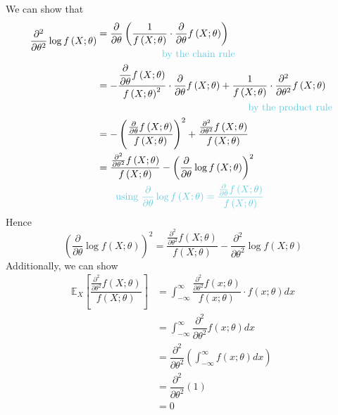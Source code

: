 \documentclass[11pt]{report} %
\begin{document}
We can show that
\begin{align}
\dfrac{\partial^{2}}{\partial \theta^{2}}\log f\left(X;\theta\right) & \begin{multlined}=\dfrac{\partial}{\partial \theta}\left(\dfrac{1}{f\left(X;\theta\right)}\cdot\dfrac{\partial}{\partial \theta}f\left(X;\theta\right)\right) \\
\text{\blue by the chain rule \black} \end{multlined} \\
& \begin{multlined}= -\dfrac{\dfrac{\partial}{\partial \theta}f\left(X;\theta\right)}{f\left(X;\theta\right)^{2}}\cdot\dfrac{\partial}{\partial \theta}f\left(X;\theta\right) + \dfrac{1}{f\left(X;\theta\right)}\cdot \dfrac{\partial^{2}}{\partial \theta^{2}}f\left(X;\theta\right) \\
\text{\blue by the product rule \black} \end{multlined} \\
&= -\left(\dfrac{\frac{\partial}{\partial \theta}f\left(X;\theta\right)}{f\left(X;\theta\right)}\right)^{2} + \dfrac{\frac{\partial^{2}}{\partial \theta^{2}}f\left(X;\theta\right)}{f\left(X;\theta\right)} \\
& \begin{multlined}= \dfrac{\frac{\partial^{2}}{\partial \theta^{2}}f\left(X;\theta\right)}{f\left(X;\theta\right)} - \left(\dfrac{\partial}{\partial \theta}\log f\left(X;\theta\right)\right)^{2} \\
\text{\blue using }\blue\dfrac{\partial}{\partial \theta}\log f\left(X;\theta\right) = \dfrac{\frac{\partial}{\partial \theta}f\left(X;\theta\right)}{f\left(X;\theta\right)}\black
\end{multlined}
\end{align}
Hence
\begin{equation}
\left(\dfrac{\partial}{\partial \theta}\log f\left(X;\theta\right)\right)^{2} = \dfrac{\frac{\partial^{2}}{\partial \theta^{2}}f\left(X;\theta\right)}{f\left(X;\theta\right)} - \dfrac{\partial^{2}}{\partial \theta^{2}}\log f\left(X;\theta\right)
\end{equation}
Additionally, we can show
\begin{align}
\mathbb{E}_{X}\left[\dfrac{\frac{\partial^{2}}{\partial \theta^{2}}f\left(X;\theta\right)}{f\left(X;\theta\right)}\right] &= \int_{-\infty}^{\infty}\dfrac{\frac{\partial^{2}}{\partial \theta^{2}}f\left(x;\theta\right)}{f\left(x;\theta\right)}\cdot f\left(x; \theta\right) dx \\
&= \int_{-\infty}^{\infty}\dfrac{\partial^{2}}{\partial \theta^{2}}f\left(x;\theta\right) dx \\
&= \dfrac{\partial^{2}}{\partial \theta^{2}}\left(\int_{-\infty}^{\infty}f\left(x;\theta\right) dx\right) \\
&= \dfrac{\partial^{2}}{\partial \theta^{2}}\left(1\right) \\
&= 0
\end{align}
\end{document}
